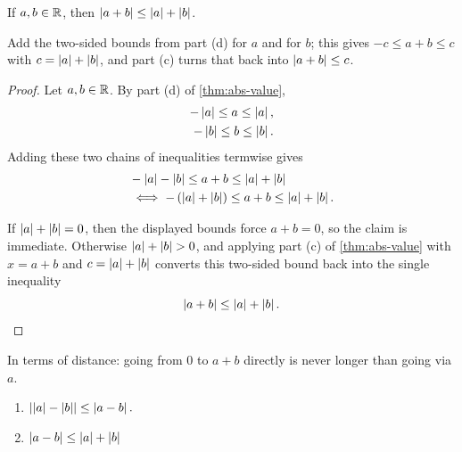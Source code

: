 \begin{proposition}
    \label{prop:triangle-inequality}
    If $a, b \in \mathbb{R}$, then $\left|a + b \right| \leq \left|a\right| + \left|b\right|$.
\end{proposition}

\begin{idea}
    Add the two-sided bounds from part (d) for $a$ and for $b$; this gives
    $-c\leq a+b\leq c$ with $c=\left|a\right|+\left|b\right|$, and part (c) turns that back
    into $\left|a+b\right|\leq c$.
\end{idea}

\begin{proof}
    Let $a, b \in \mathbb{R}$. By part (d) of \cref{thm:abs-value},
    \begin{align*}
        -\left|a\right| \leq a \leq \left|a\right|, \\
        -\left|b\right| \leq b \leq \left|b\right|.
    \end{align*}
    Adding these two chains of inequalities termwise gives
    \begin{align*}
        &-\left|a\right| - \left|b\right| \leq a + b \leq \left|a\right| + \left|b\right| \\
        &\iff - \left(\left|a\right| + \left|b\right|\right) \leq a + b \leq \left|a\right| + \left|b\right|.
    \end{align*}

    If $\left|a\right|+\left|b\right|=0$, then the displayed bounds force $a+b=0$, so the
    claim is immediate. Otherwise $\abs{a}+\abs{b}>0$, and applying part (c)
    of \cref{thm:abs-value} with $x = a+b$ and $c = \left|a\right|+\left|b\right|$ converts
    this two-sided bound back into the single inequality
    \begin{equation*}
        \left|a + b\right| \leq \left|a\right| + \left|b\right|.
    \end{equation*}
\end{proof}

In terms of distance: going from $0$ to $a+b$ directly is never longer than going via $a$.


\begin{corollary}\label{cor:reverse-triangle}
    \leavevmode
    \begin{enumerate}[label=(\roman*)]
        \item $\left|\left|a\right| - \left|b\right|\right| \leq \left|a - b\right|.$
        \item $\left|a - b\right| \leq \left|a\right| + \left|b\right|$
    \end{enumerate}
\end{corollary}

